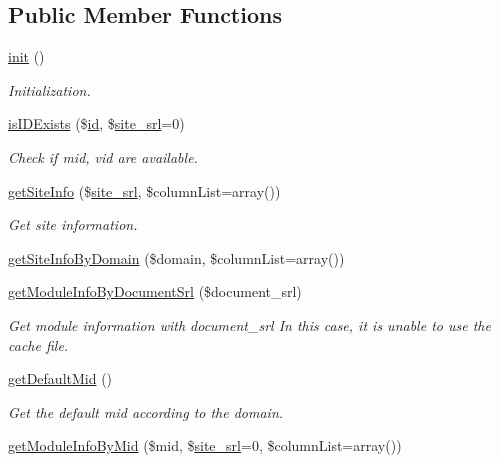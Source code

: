 \subsection*{Public Member Functions}
\begin{DoxyCompactItemize}
\item 
\hyperlink{classmoduleModel_a1d6fb4cdd3dd5e068e71cacc551f517c}{init} ()
\begin{DoxyCompactList}\small\item\em Initialization. \end{DoxyCompactList}\item 
\hyperlink{classmoduleModel_a5f53ae1101876e8967cc3c40e54badcd}{is\+I\+D\+Exists} (\$\hyperlink{JSSpec_8js_ae8ddf9e890c62bf03be54143867a14a8}{id}, \$\hyperlink{ko_8install_8php_a8b1406b4ad1048041558dce6bfe89004}{site\+\_\+srl}=0)
\begin{DoxyCompactList}\small\item\em Check if mid, vid are available. \end{DoxyCompactList}\item 
\hyperlink{classmoduleModel_a96446e3b8e031ec1264c7187cb1384a5}{get\+Site\+Info} (\$\hyperlink{ko_8install_8php_a8b1406b4ad1048041558dce6bfe89004}{site\+\_\+srl}, \$column\+List=array())
\begin{DoxyCompactList}\small\item\em Get site information. \end{DoxyCompactList}\item 
\hyperlink{classmoduleModel_a6c4e1496c55c3c15507bb9532cb01c7f}{get\+Site\+Info\+By\+Domain} (\$domain, \$column\+List=array())
\item 
\hyperlink{classmoduleModel_a6b3ba81393e32a934f7bff65f05663d5}{get\+Module\+Info\+By\+Document\+Srl} (\$document\+\_\+srl)
\begin{DoxyCompactList}\small\item\em Get module information with document\+\_\+srl In this case, it is unable to use the cache file. \end{DoxyCompactList}\item 
\hyperlink{classmoduleModel_ae76b5be74783d11b676b167ba2c63523}{get\+Default\+Mid} ()
\begin{DoxyCompactList}\small\item\em Get the default mid according to the domain. \end{DoxyCompactList}\item 
\hyperlink{classmoduleModel_a543ca661568188ef493ff138246de29c}{get\+Module\+Info\+By\+Mid} (\$mid, \$\hyperlink{ko_8install_8php_a8b1406b4ad1048041558dce6bfe89004}{site\+\_\+srl}=0, \$column\+List=array())

\end{DoxyCompactItemize}
